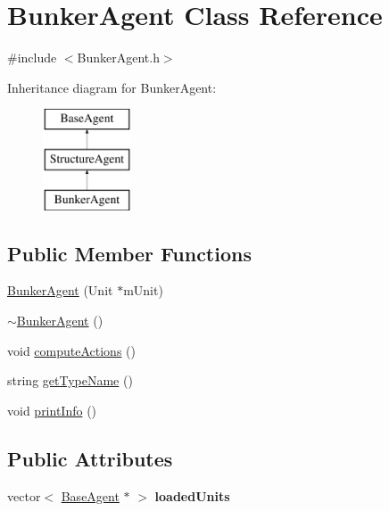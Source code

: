 \hypertarget{class_bunker_agent}{
\section{BunkerAgent Class Reference}
\label{class_bunker_agent}
}


{\ttfamily \#include $<$BunkerAgent.h$>$}

Inheritance diagram for BunkerAgent:\begin{figure}[H]
\begin{center}
\leavevmode
\includegraphics[height=3.000000cm]{class_bunker_agent}
\end{center}
\end{figure}
\subsection*{Public Member Functions}
\begin{DoxyCompactItemize}
\item 
\hyperlink{class_bunker_agent_ad9f1ee25f043a1f9a17e1742300660c0}{BunkerAgent} (Unit $\ast$mUnit)
\item 
\hyperlink{class_bunker_agent_aab7208e8b978348691cf10acb86d60e0}{$\sim$BunkerAgent} ()
\item 
void \hyperlink{class_bunker_agent_afa86a236a39240840524f01593a9975b}{computeActions} ()
\item 
string \hyperlink{class_bunker_agent_af3bf79a646dc7c52f3d6869c1a3a15f6}{getTypeName} ()
\item 
void \hyperlink{class_bunker_agent_a3e3a29e965d036a9011f5669d60acac1}{printInfo} ()
\end{DoxyCompactItemize}
\subsection*{Public Attributes}
\begin{DoxyCompactItemize}
\item 
\hypertarget{class_bunker_agent_a8e5de909619ef2e36083028e99682a14}{
vector$<$ \hyperlink{class_base_agent}{BaseAgent} $\ast$ $>$ {\bfseries loadedUnits}}
\label{class_bunker_agent_a8e5de909619ef2e36083028e99682a14}

\end{DoxyCompactItemize}



